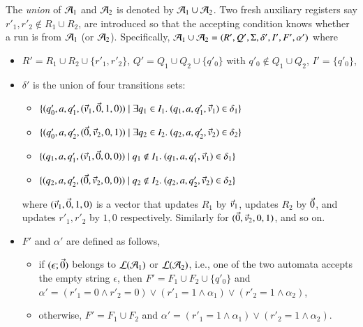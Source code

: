 The \emph{union} of $\mathcal{A}_1$ and $\mathcal{A}_2$ is denoted by $\mathcal{A}_1 \cup \mathcal{A}_2$. Two fresh auxiliary registers say $r'_1,r'_2 \not \in R_1 \cup R_2$, are introduced so that the accepting condition knows whether a run is from $\mathcal{A}_1$ (or $\mathcal{A}_2$).    
Specifically, $\mathcal{A}_1 \cup \mathcal{A}_2 = (R', Q', \Sigma, \delta', I', F', \alpha')$ where 
\begin{itemize}
\item $R' = R_1 \cup R_2 \cup \{r'_1, r'_2\}$, $Q' = Q_1 \cup Q_2 \cup \{q'_0\}$ with $q'_0 \not \in Q_1 \cup Q_2$, $I' = \{q'_0\}$, 
%
\item $\delta'$ is the union of four transitions sets:
\begin{itemize}
  \item $\{(q'_0, a, q'_1, (\vec{v}_1, \vec{0}, 1,0)) \mid \exists q_1 \in I_1.\ (q_1, a, q'_1, \vec{v}_1) \in \delta_1\}$
  \item $\{(q'_0, a, q'_2, (\vec{0}, \vec{v}_2, 0, 1)) \mid \exists q_2 \in I_2.\ (q_2, a, q'_2, \vec{v}_2) \in \delta_2\}$
  \item $\{(q_1, a, q'_1, (\vec{v}_1, \vec{0}, 0, 0)) \mid q_1\not\in I_1.\ (q_1, a, q'_1, \vec{v}_1) \in \delta_1\}$
  \item $\{(q_2, a, q'_2, (\vec{0}, \vec{v}_2, 0, 0)) \mid q_2\not\in I_2.\ (q_2, a, q'_2, \vec{v}_2) \in \delta_2\}$
\end{itemize}
 where $(\vec{v}_1, \vec{0}, 1,0)$ is a vector that updates $R_1$ by $\vec{v}_1$, updates $R_2$ by $\vec{0}$, and updates $r'_1,r'_2$ by $1,0$ respectively. Similarly for $(\vec{0}, \vec{v}_2, 0, 1)$, and so on.

\item $F'$ and $\alpha'$ are defined as follows, 
\begin{itemize}
\item if $(\epsilon; \vec{0})$ belongs to $\mathcal{L}(\mathcal{A}_1)$ or $\mathcal{L}(\mathcal{A}_2)$, i.e., one of the two automata accepts the empty string $\epsilon$, then $F' = F_1 \cup F_2 \cup \{q'_0\}$ and $\alpha' = (r'_1 = 0 \wedge r'_2 = 0) \vee (r'_1=1 \wedge \alpha_1) \vee (r'_2=1 \wedge \alpha_2)$, 
\item otherwise, $F'=F_1 \cup F_2$ and $\alpha' = (r'_1=1 \wedge \alpha_1) \vee (r'_2=1 \wedge \alpha_2)$.
\end{itemize}
\end{itemize}
